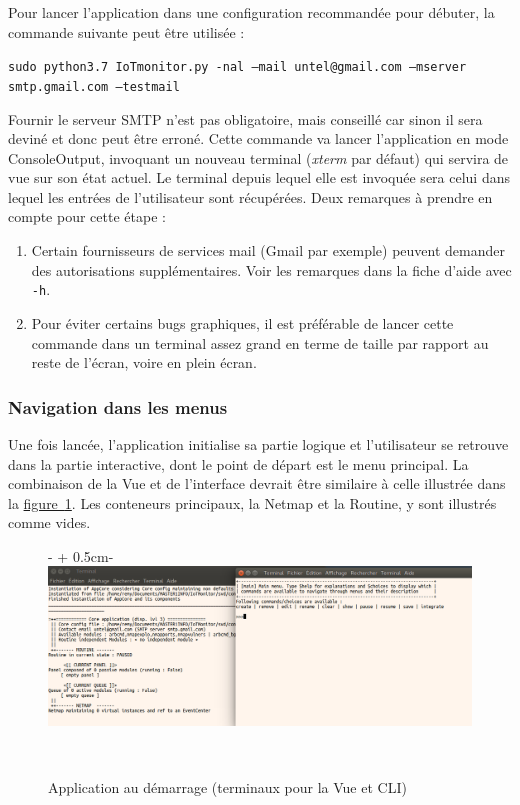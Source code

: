 \documentclass[]{article}
\newcommand{\wordlink}[2]{\hyperref[#1]{#2~\ref{#1}}}
\begin{document}
\newpage

\par Pour lancer l'application dans une configuration recommandée pour débuter, la commande suivante peut être utilisée :
\begin{center}
\texttt{sudo python3.7 IoTmonitor.py -nal --mail untel@gmail.com --mserver smtp.gmail.com --testmail}
\end{center} 

Fournir le serveur SMTP n'est pas obligatoire, mais conseillé car sinon il sera deviné et donc peut être erroné. Cette commande va lancer l'application en mode ConsoleOutput, invoquant un nouveau terminal (\textit{xterm} par défaut) qui servira de vue sur son état actuel. Le terminal depuis lequel elle est invoquée sera celui dans lequel les entrées de l'utilisateur sont récupérées. Deux remarques à prendre en compte pour cette étape :

\begin{enumerate}
\item Certain fournisseurs de services mail (Gmail par exemple) peuvent demander des autorisations supplémentaires. Voir les remarques dans la fiche d'aide avec \texttt{-h}.
\vspace{0.2cm}
\item Pour éviter certains bugs graphiques, il est préférable de lancer cette commande dans un terminal assez grand en terme de taille par rapport au reste de l'écran, voire en plein écran.
\end{enumerate}

\subsubsection{Navigation dans les menus}

Une fois lancée, l'application initialise sa partie logique et l'utilisateur se retrouve dans la partie interactive, dont le point de départ est le menu principal. La combinaison de la Vue et de l'interface devrait être similaire à celle illustrée dans la \wordlink{startapp}{figure}. Les conteneurs principaux, la Netmap et la Routine, y sont illustrés comme vides.

\begin{figure}[!ht]
   \begin{adjustwidth}{-\oddsidemargin-1in + 0.5cm}{-\rightmargin}
     \centering
     \includegraphics[width=\paperwidth - 1cm]{test_viewandCLI}
     \caption{Application au démarrage (terminaux pour la Vue et CLI)}
     \label{startapp}
   \end{adjustwidth}
   \
\end{figure}
\end{document}
